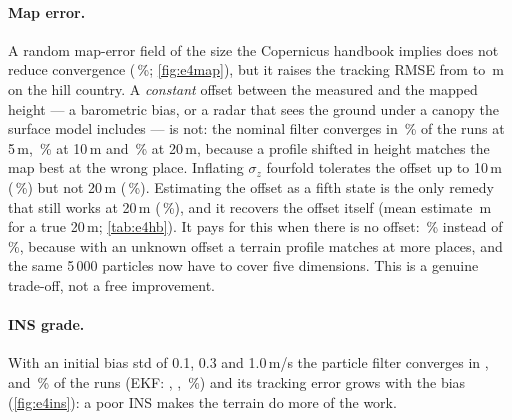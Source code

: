 \paragraph{Map error.} A random map-error field of the size the Copernicus handbook implies does
not reduce convergence (\EFourMapErrorHillZeroPfFiveZeroZeroZeroConv\,\%; \cref{fig:e4map}), but it
raises the tracking RMSE from \EFourOutliersHillZeroPfFiveZeroZeroZeroTrack{} to
\EFourMapErrorHillZeroPfFiveZeroZeroZeroTrack\,m on the hill country. A
\emph{constant} offset between the measured and the mapped height --- a barometric bias, or a radar
that sees the ground under a canopy the surface model includes --- is not: the nominal filter
converges in \EFourMapErrorHillFivePfFiveZeroZeroZeroConv\,\% of the runs at 5\,m,
\EFourMapErrorHillOneZeroPfFiveZeroZeroZeroConv\,\% at 10\,m and
\EFourMapErrorHillTwoZeroPfFiveZeroZeroZeroConv\,\% at 20\,m, because a profile shifted in height
matches the map best at the wrong place. Inflating $\sigma_z$ fourfold tolerates the offset up
to 10\,m (\EFourMapErrorHillOneZeroPfSzXFourConv\,\%) but not 20\,m
(\EFourMapErrorHillTwoZeroPfSzXFourConv\,\%). Estimating the offset as a fifth state is the only
remedy that still works at 20\,m (\EFourMapErrorHillTwoZeroPfHbiasConv\,\%), and it recovers the
offset itself (mean estimate \EFourHbHillOTwoZeroMean\,m for a true 20\,m; \cref{tab:e4hb}). It
pays for this when there is no offset: \EFourMapErrorHillZeroPfHbiasConv\,\% instead of
\EFourMapErrorHillZeroPfFiveZeroZeroZeroConv\,\%, because with an unknown offset a terrain
profile matches at more places, and the same 5\,000 particles now have to cover five dimensions.
This is a genuine trade-off, not a free improvement.

\paragraph{INS grade.} With an initial bias std of 0.1, 0.3 and 1.0\,m/s the particle filter
converges in \EFourInsGradeHillZeroPointOnePfFiveZeroZeroZeroConv,
\EFourInsGradeHillZeroPointThreePfFiveZeroZeroZeroConv{} and
\EFourInsGradeHillOnePfFiveZeroZeroZeroConv\,\% of the runs (EKF:
\EFourInsGradeHillZeroPointOneEkfConv, \EFourInsGradeHillZeroPointThreeEkfConv,
\EFourInsGradeHillOneEkfConv\,\%) and its tracking error grows with the bias
(\cref{fig:e4ins}): a poor INS makes the terrain do more of the work.


\begin{table}[t]
  \centering\small
  \caption{E4: offset estimated by the offset-state PF (mean over the final 100\,s, converged
    runs).}\label{tab:e4hb}
  
\end{table}

